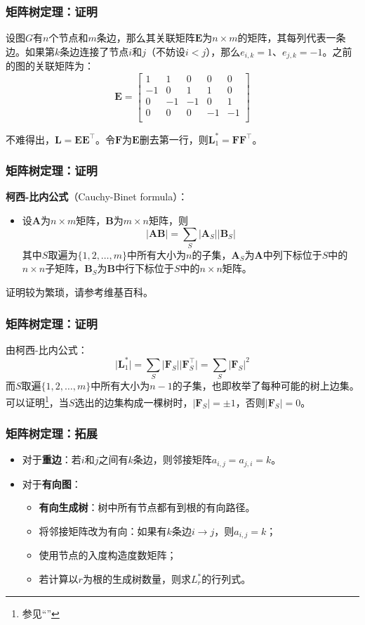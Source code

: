 \documentclass[9pt,dvipsnames]{beamer}
\renewcommand{\det}[1]{\vert{#1}\vert}
\begin{document}
\begin{frame}
	\frametitle{矩阵树定理：证明}
	设图$G$有$n$个节点和$m$条边，那么其关联矩阵$\mathbf{E}$为$n\times m$的矩阵，其每列代表一条边。如果第$k$条边连接了节点$i$和$j$（不妨设$i<j$），那么$e_{i,k}=1$、$e_{j,k}=-1$。之前的图的关联矩阵为：
	\[ \mathbf{E} = \left[\begin{matrix}
		 1 &  1 &  0 &  0 &  0 \\
		-1 &  0 &  1 &  1 &  0 \\
		 0 & -1 & -1 &  0 &  1 \\
		 0 &  0 &  0 & -1 & -1 \\
	\end{matrix}\right] \]

	不难得出，$\mathbf{L}=\mathbf{EE}^\top$。令$\mathbf{F}$为$\mathbf{E}$删去第一行，则$\mathbf{L}^*_1=\mathbf{FF}^\top$。
\end{frame}
\begin{frame}
	\frametitle{矩阵树定理：证明}
	\textbf{柯西-比内公式}（Cauchy-Binet formula）：
	\begin{itemize}
		\item 设$\mathbf{A}$为$n\times m$矩阵，$\mathbf{B}$为$m\times n$矩阵，则
			\[ \det{\mathbf{AB}}=\sum_S \det{\mathbf{A}_S}\det{\mathbf{B}_S} \]
			其中$S$取遍为$\{1,2,\ldots,m\}$中所有大小为$n$的子集，$\mathbf{A}_S$为$\mathbf{A}$中列下标位于$S$中的$n\times n$子矩阵，$\mathbf{B}_S$为$\mathbf{B}$中行下标位于$S$中的$n\times n$矩阵。
	\end{itemize}

	证明较为繁琐，请参考维基百科。
\end{frame}
\begin{frame}
	\frametitle{矩阵树定理：证明}
	由柯西-比内公式：
	\[ \det{\mathbf{L}^*_1} = \sum_S \det{\mathbf{F}_S}\det{\mathbf{F}^\top_S} = \sum_S \det{\mathbf{F}_S}^2 \]
	而$S$取遍$\{1,2,\ldots,m\}$中所有大小为$n-1$的子集，也即枚举了每种可能的树上边集。可以证明\footnote{参见``\underline{}''}，当$S$选出的边集构成一棵树时，$\det{\mathbf{F}_S}=\pm 1$，否则$\det{\mathbf{F}_S}=0$。
\end{frame}
\begin{frame}
	\frametitle{矩阵树定理：拓展}
	\begin{itemize}
		\item 对于\textbf{重边}\pause{}：若$i$和$j$之间有$k$条边，则邻接矩阵$a_{i,j}=a_{j,i}=k$。\pause
		\item 对于\textbf{有向图}：\begin{itemize}
			\item \textbf{有向生成树}：树中所有节点都有到根的有向路径。\pause
			\item 将邻接矩阵改为有向：如果有$k$条边$i\rightarrow j$，则$a_{i,j}=k$；
			\item 使用节点的入度构造度数矩阵；
			\item 若计算以$r$为根的生成树数量，则求$L^*_r$的行列式。
		\end{itemize}
	\end{itemize}
\end{frame}
\end{document}
